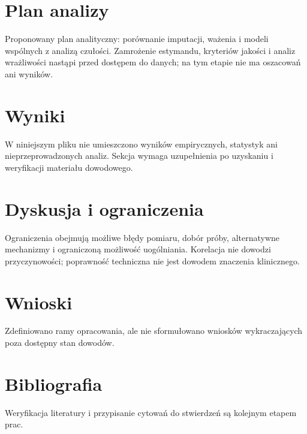 \documentclass[11pt,a4paper]{article}
\begin{document}
\section{Plan analizy}

Proponowany plan analityczny: porównanie imputacji, ważenia i modeli wspólnych z analizą czułości. Zamrożenie estymandu, kryteriów jakości i analiz wrażliwości nastąpi przed dostępem do danych; na tym etapie nie ma oszacowań ani wyników.

\section{Wyniki}

W niniejszym pliku nie umieszczono wyników empirycznych, statystyk ani nieprzeprowadzonych analiz. Sekcja wymaga uzupełnienia po uzyskaniu i weryfikacji materiału dowodowego.

\section{Dyskusja i ograniczenia}

Ograniczenia obejmują możliwe błędy pomiaru, dobór próby, alternatywne mechanizmy i ograniczoną możliwość uogólniania. Korelacja nie dowodzi przyczynowości; poprawność techniczna nie jest dowodem znaczenia klinicznego.

\section{Wnioski}

Zdefiniowano ramy opracowania, ale nie sformułowano wniosków wykraczających poza dostępny stan dowodów.

\section*{Bibliografia}

Weryfikacja literatury i przypisanie cytowań do stwierdzeń są kolejnym etapem prac.
\end{document}
